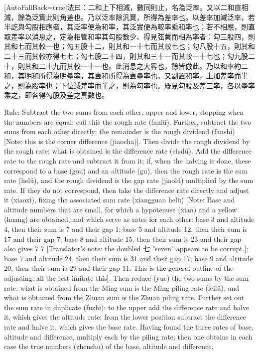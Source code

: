 \documentclass[11pt]{article}
\newcommand{\zhsmall}{\footnotesize\color{black!70}}
\newcommand{\unitlabel}[1]{\marginpar{\raggedleft\tiny\color{gray}#1}}
\newenvironment{unitzh}{\par\CJKfontspec{Noto Serif CJK SC}[AutoFallBack=true]\large\linespread{1.25}\selectfont}{\par}
\newenvironment{uniten}{\par\small\color{black!85}}{\par\medskip}
\begin{document}
\begin{unitzh}\unitlabel{ceyuan-025.2}法曰：二和上下相減，數同則止，名為泛率。又以二和直相減，餘為泛實{\zhsmall 此則角差也}。乃以泛率除汎實，所得為差率也。以差率加減泛率，若半訖與勾股相應者，其泛率便為和率，其泛實便為較率乘和率也；若不相應，則直取差率以消息之，定為相管和率{\zhsmall 其勾股數少、得見弦黄而相為率者：勾三股四，則其和七而其較一也；勾五股十二，則其和一十七而其較七也；勾八股十五，則其和二十三而其較亦得七七；勾七股二十四，則其和三十一而其較一十七也；勾九股二十，則其和二十九而其較一十一也。此消息之大畧也，餘皆倣此}。乃以和率約二和，其明和所得為明壘率，其叀和所得為叀壘率也。又副置和率，上加差率而半之，則為股率也；下位減差率而半之，則為勾率也。既見勾股及差三率，各以壘率乘之，即各得勾股及差之真數也。\end{unitzh}
\begin{uniten}Rule: Subtract the two sums from each other, upper and lower, stopping when the numbers are equal; call this the rough rate (fanlü). Further, subtract the two sums from each other directly; the remainder is the rough dividend (fanshi) [Note: this is the corner difference (jiaocha)]. Then divide the rough dividend by the rough rate; what is obtained is the difference rate (chalü). Add the difference rate to the rough rate and subtract it from it; if, when the halving is done, these correspond to a base (gou) and an altitude (gu), then the rough rate is the sum rate (helü), and the rough dividend is the gap rate (jiaolü) multiplied by the sum rate. If they do not correspond, then take the difference rate directly and adjust it (xiaoxi), fixing the associated sum rate (xiangguan helü) [Note: Base and altitude numbers that are small, for which a hypotenuse (xian) and a yellow (huang) are obtained, and which serve as rates for each other: base 3 and altitude 4, then their sum is 7 and their gap 1; base 5 and altitude 12, then their sum is 17 and their gap 7; base 8 and altitude 15, then their sum is 23 and their gap also gives 7 7 [Translator's note: the doubled 七 "seven" appears to be corrupt.]; base 7 and altitude 24, then their sum is 31 and their gap 17; base 9 and altitude 20, then their sum is 29 and their gap 11. This is the general outline of the adjusting; all the rest imitate this]. Then reduce (yue) the two sums by the sum rate: what is obtained from the Ming sum is the Ming piling rate (leilü), and what is obtained from the Zhuan sum is the Zhuan piling rate. Further set out the sum rate in duplicate (fuzhi): to the upper add the difference rate and halve it, which gives the altitude rate; from the lower position subtract the difference rate and halve it, which gives the base rate. Having found the three rates of base, altitude and difference, multiply each by the piling rate; then one obtains in each case the true numbers (zhenshu) of the base, altitude and difference.\end{uniten}
\end{document}

